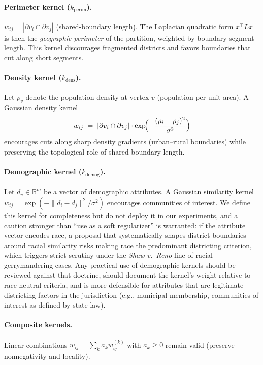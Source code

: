 \documentclass[11pt]{article}
\newcommand{\R}{\mathbb{R}}
\begin{document}
\paragraph{Perimeter kernel ($k_{\mathrm{perim}}$).} $w_{ij} = |\partial v_i \cap \partial v_j|$
(shared-boundary length). The Laplacian quadratic form $x^\top L x$
is then the \emph{geographic perimeter} of the partition, weighted by
boundary segment length. This kernel discourages fragmented districts
and favors boundaries that cut along short segments.

\paragraph{Density kernel ($k_{\mathrm{dens}}$).} Let $\rho_v$ denote
the population density at vertex $v$ (population per unit area). A
Gaussian density kernel
\[
  w_{ij} \;=\; |\partial v_i \cap \partial v_j| \cdot
  \exp\!\Bigl( -\frac{(\rho_i - \rho_j)^2}{\sigma^2} \Bigr)
\]
encourages cuts along sharp density gradients (urban--rural
boundaries) while preserving the topological role of shared boundary
length.

\paragraph{Demographic kernel ($k_{\mathrm{demog}}$).} Let
$d_v \in \R^m$ be a vector of demographic attributes. A Gaussian
similarity kernel $w_{ij} = \exp(-\|d_i - d_j\|^2 / \sigma^2)$
encourages communities of interest. We define this kernel for
completeness but do not deploy it in our experiments, and a caution
stronger than ``use as a soft regularizer'' is warranted: if the
attribute vector encodes race, a proposal that systematically shapes
district boundaries around racial similarity risks making race the
predominant districting criterion, which triggers strict scrutiny
under the \emph{Shaw v.\ Reno} line of racial-gerrymandering cases.
Any practical use of demographic kernels should be reviewed against
that doctrine, should document the kernel's weight relative to
race-neutral criteria, and is more defensible for attributes that are
legitimate districting factors in the jurisdiction (e.g., municipal
membership, communities of interest as defined by state law).

\paragraph{Composite kernels.} Linear combinations $w_{ij} = \sum_k a_k w_{ij}^{(k)}$
with $a_k \ge 0$ remain valid (preserve nonnegativity and locality).
\end{document}
